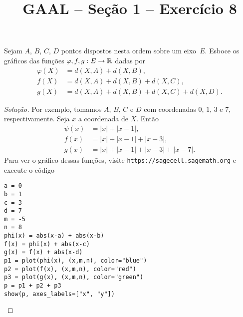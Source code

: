 \documentclass[a4paper,11pt]{article}
\title{GAAL -- Seção 1 -- Exercício 8}
\author{\empty}
\date{\empty}
\newcommand\onlyinsubfileone\maketitle
\begin{document}
\onlyinsubfileone

\begin{exercicio-gaal}[E8.S1]
  Sejam $A$, $B$, $C$, $D$ pontos dispostos nesta ordem sobre um eixo~$E$.
  Esboce os gráficos das funções $\varphi, f, g : E \to \mathbb{R}$ dadas por
  \begin{align*}
    \varphi(X) & = d(X,A) + d(X,B), \\
    f(X) & = d(X,A) + d(X,B) + d(X,C), \\
    g(X) & = d(X,A) + d(X,B) + d(X,C) + d(X,D).
  \end{align*}
\end{exercicio-gaal}

\begin{proof}[Solução]
  Por exemplo, tomamos $A$, $B$, $C$ e $D$ com coordenadas $0$, $1$, $3$ e $7$, respectivamente.
  Seja $x$ a coordenada de $X$.
  Então
  \begin{align*}
    \psi(x) & = |x| + |x-1|, \\
    f(x) & = |x| + |x-1| + |x-3|, \\
    g(x) & = |x| + |x-1| + |x-3| + |x-7|.
  \end{align*}
  Para ver o gráfico dessas funções, visite \texttt{https://sagecell.sagemath.org} e execute o código
\begin{verbatim}
a = 0
b = 1
c = 3
d = 7
m = -5
n = 8
phi(x) = abs(x-a) + abs(x-b)
f(x) = phi(x) + abs(x-c)
g(x) = f(x) + abs(x-d)
p1 = plot(phi(x), (x,m,n), color="blue")
p2 = plot(f(x), (x,m,n), color="red")
p3 = plot(g(x), (x,m,n), color="green")
p = p1 + p2 + p3
show(p, axes_labels=["x", "y"])
\end{verbatim}
\end{proof}
\end{document}
